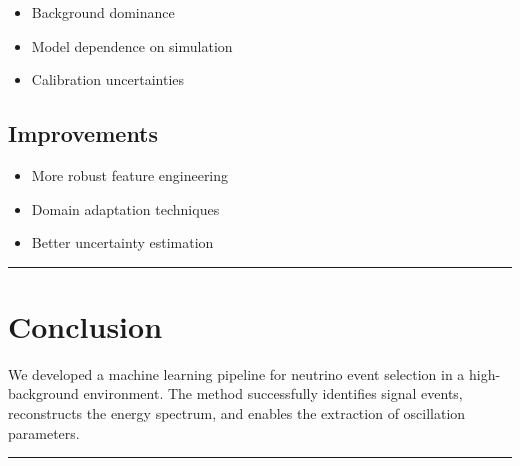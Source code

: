 \documentclass[
  authoryear,
  preprint]{elsarticle}
\providecommand{\tightlist}{%
  \setlength{\itemsep}{0pt}\setlength{\parskip}{0pt}}
\begin{document}
\begin{itemize}
\tightlist
\item
  Background dominance
\item
  Model dependence on simulation
\item
  Calibration uncertainties
\end{itemize}

\subsection{Improvements}\label{improvements}

\begin{itemize}
\tightlist
\item
  More robust feature engineering
\item
  Domain adaptation techniques
\item
  Better uncertainty estimation
\end{itemize}

\begin{center}\rule{0.5\linewidth}{0.5pt}\end{center}

\section{Conclusion}\label{conclusion}

We developed a machine learning pipeline for neutrino event selection in
a high-background environment. The method successfully identifies signal
events, reconstructs the energy spectrum, and enables the extraction of
oscillation parameters.

\begin{center}\rule{0.5\linewidth}{0.5pt}\end{center}


\renewcommand\refname{References}

\end{document}

